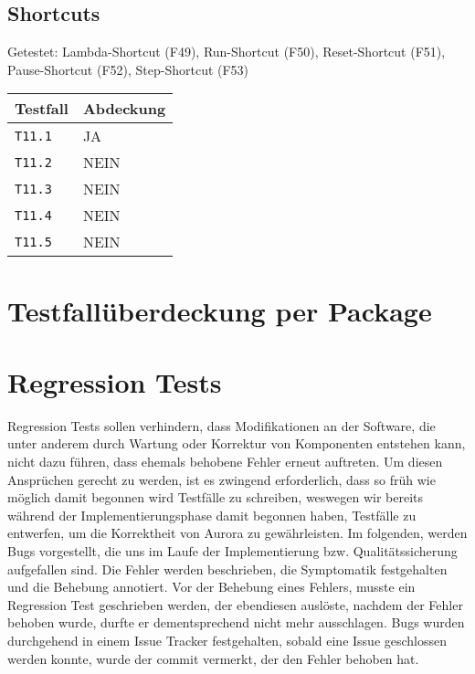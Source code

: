 \documentclass[parskip=full,11pt,twoside]{scrartcl}
\newcommand{\testline}[2]{
    \texttt{#1} & \ifthenelse{\equal{#2}{JA}}{\cellcolor{green!20}}{\cellcolor{red!20}}#2 \\ \hline
}
\begin{document}
\subsection{Shortcuts}
    Getestet:
    Lambda-Shortcut (F49),
    Run-Shortcut (F50),
    Reset-Shortcut (F51),
    Pause-Shortcut (F52),
    Step-Shortcut (F53)

    \label{shortcuts}
    \begin{center}
        \begin{tabular}{ p{9cm} p{4cm}}
            Testfall & Abdeckung \\ \hline
            \testline{T11.1}{JA}
            \testline{T11.2}{NEIN}
            \testline{T11.3}{NEIN}
            \testline{T11.4}{NEIN}
            \testline{T11.5}{NEIN}
        \end{tabular}
    \end{center}

\section{Testfallüberdeckung per Package}

\section{Regression Tests}
    Regression Tests sollen verhindern, dass Modifikationen an der Software, die unter anderem durch Wartung oder Korrektur von Komponenten entstehen kann, nicht dazu führen,
        dass ehemals behobene Fehler erneut auftreten.
    Um diesen Ansprüchen gerecht zu werden, ist es zwingend erforderlich, dass so früh wie möglich damit begonnen wird Testfälle zu schreiben,
        weswegen wir bereits während der Implementierungsphase damit begonnen haben, Testfälle zu entwerfen, um die Korrektheit von Aurora zu gewährleisten.
    Im folgenden, werden Bugs vorgestellt, die uns im Laufe der Implementierung bzw. Qualitätssicherung aufgefallen sind.
    Die Fehler werden beschrieben, die Symptomatik festgehalten und die Behebung annotiert.
    Vor der Behebung eines Fehlers, musste ein Regression Test geschrieben werden, der ebendiesen auslöste, nachdem der Fehler behoben wurde, durfte er dementsprechend nicht mehr ausschlagen.
    Bugs wurden durchgehend in einem Issue Tracker festgehalten, sobald eine Issue geschlossen werden konnte, wurde der commit vermerkt, der den Fehler behoben hat.
    
\end{document}
